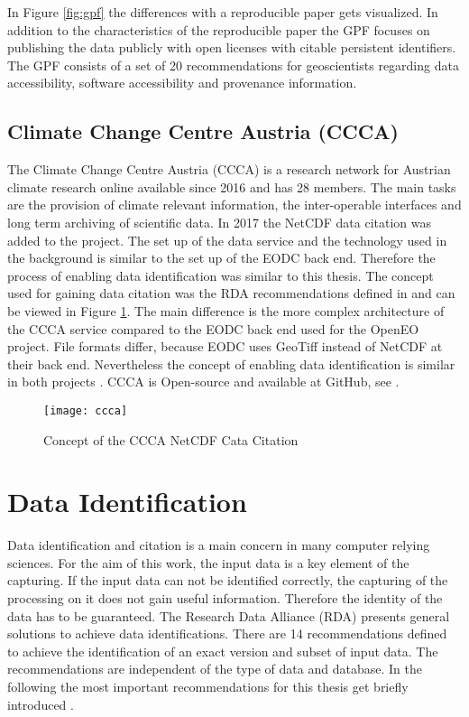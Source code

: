 \documentclass[draft,final]{vutinfth} %
\begin{document}
In Figure \ref{fig:gpf} the differences with a reproducible paper gets visualized. In addition to the characteristics of the reproducible paper the GPF focuses on publishing the data publicly with open licenses with citable persistent identifiers.
The GPF consists of a set of 20 recommendations for geoscientists regarding data accessibility, software accessibility and provenance information. 

\subsection{Climate Change Centre Austria (CCCA)}
The Climate Change Centre Austria (CCCA) is a research network for Austrian climate research online available since 2016 and has 28 members. The main tasks are the provision of climate relevant information, the inter-operable interfaces and long term archiving of scientific data. In 2017 the NetCDF data citation was added to the project. The set up of the data service and the technology used in the background is similar to the set up of the EODC back end. Therefore the process of enabling data identification was similar to this thesis. The concept used for gaining data citation was the RDA recommendations defined in \cite{rauber2016identification} and can be viewed in Figure \ref{fig:ccca}. The main difference is the more complex architecture of the CCCA service compared to the EODC back end used for the OpenEO project. File formats differ, because EODC uses GeoTiff instead of NetCDF at their back end. Nevertheless the concept of enabling data identification is similar in both projects \cite{ccca}. CCCA is Open-source and available at GitHub, see \cite{ccca_github}.  

\begin{figure}[h]
	\centering
	\texttt{[image: ccca]}
	\caption{Concept of the CCCA NetCDF Cata Citation \cite{ccca}}
	\label{fig:ccca} %
\end{figure}

\section{Data Identification}\label{Data Identification}
Data identification and citation is a main concern in many computer relying sciences. For the aim of this work, the input data is a key element of the capturing. If the input data can not be identified correctly, the capturing of the processing on it does not gain useful information. Therefore the identity of the data has to be guaranteed. The Research Data Alliance (RDA) presents general solutions to achieve data identifications. There are 14 recommendations defined to achieve the identification of an exact version and subset of input data. The recommendations are independent of the type of data and database.  In the following the most important recommendations for this thesis get briefly introduced \cite{rauber2016identification}.
\end{document}

